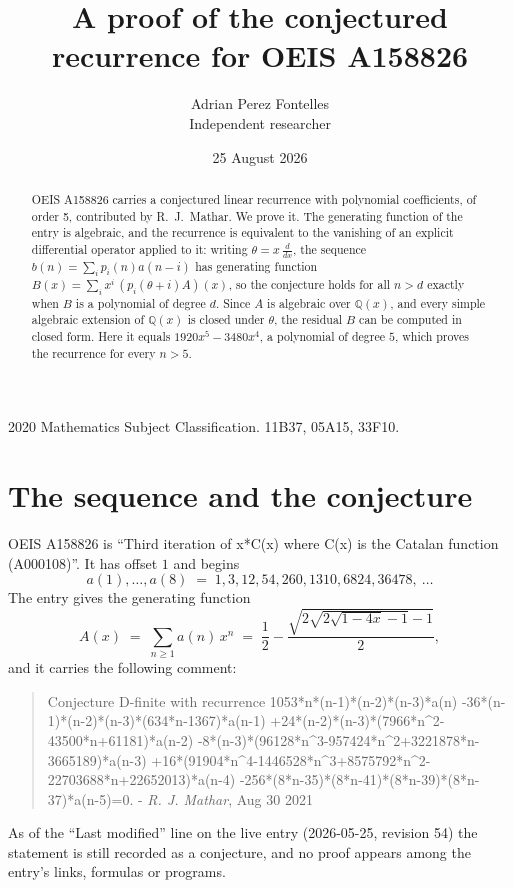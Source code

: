 \documentclass[11pt,a4paper]{article}
\title{A proof of the conjectured recurrence for OEIS A158826}
\author{Adrian Perez Fontelles\\ \small Independent researcher}
\date{25 August 2026}
\theoremstyle{plain}
\theoremstyle{definition}
\begin{document}
\maketitle

\begin{abstract}
OEIS A158826 carries a conjectured linear recurrence with polynomial coefficients, of
order 5, contributed by R.~J.~Mathar. We prove it. The generating function of the
entry is algebraic, and the recurrence is equivalent to the vanishing of an explicit
differential operator applied to it: writing $\theta=x\,\frac{d}{dx}$, the sequence
$b(n)=\sum_{i}p_{i}(n)a(n-i)$ has generating function
$B(x)=\sum_{i}x^{i}\,(p_{i}(\theta+i)A)(x)$, so the conjecture holds for all $n>d$ exactly
when $B$ is a polynomial of degree $d$. Since $A$ is algebraic over $\mathbb{Q}(x)$, and every simple
algebraic extension of $\mathbb{Q}(x)$ is closed under $\theta$, the residual $B$ can be
computed in closed form. Here it equals $1920 x^{5} - 3480 x^{4}$, a polynomial of degree $5$, which proves
the recurrence for every $n>5$.
\end{abstract}

\noindent\small 2020 Mathematics Subject Classification. 11B37, 05A15, 33F10.\normalsize

\section{The sequence and the conjecture}

OEIS A158826 is ``Third iteration of x*C(x) where C(x) is the Catalan function (A000108)''. It has offset $1$ and begins
\[
a(1),\dots,a(8)\;=\;1, 3, 12, 54, 260, 1310, 6824, 36478,\ \dots
\]
The entry gives the generating function
\begin{equation}\label{eq:gf}
A(x)\;=\;\sum_{n\ge 1} a(n)\,x^{n}\;=\;\frac{1}{2} - \frac{\sqrt{2 \sqrt{2 \sqrt{1 - 4 x} - 1} - 1}}{2} ,
\end{equation}
and it carries the following comment:
\begin{quote}\small
Conjecture D-finite with recurrence 1053*n*(n-1)*(n-2)*(n-3)*a(n) -36*(n-1)*(n-2)*(n-3)*(634*n-1367)*a(n-1) +24*(n-2)*(n-3)*(7966*n\textasciicircum{}2-43500*n+61181)*a(n-2) -8*(n-3)*(96128*n\textasciicircum{}3-957424*n\textasciicircum{}2+3221878*n-3665189)*a(n-3) +16*(91904*n\textasciicircum{}4-1446528*n\textasciicircum{}3+8575792*n\textasciicircum{}2-22703688*n+22652013)*a(n-4) -256*(8*n-35)*(8*n-41)*(8*n-39)*(8*n-37)*a(n-5)=0. - \emph{R. J. Mathar}, Aug 30 2021
\end{quote}
As of the ``Last modified'' line on the live entry (2026-05-25, revision 54) the
statement is still recorded as a conjecture, and no proof appears among the entry's links,
formulas or programs.
\end{document}
